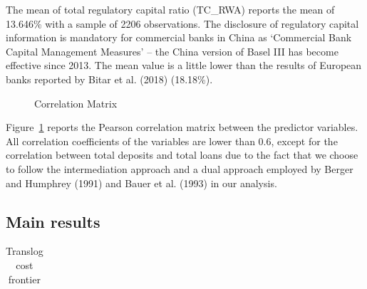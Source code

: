 \documentclass[
  12pt,
  a4paper,
]{scrreprt}
\begin{document}
{{{{The mean of total regulatory capital ratio (TC\_RWA) reports the mean of
13.646\% with a sample of 2206 observations. The disclosure of
regulatory capital information is mandatory for commercial banks in
China as `Commercial Bank Capital Management Measures' -- the China
version of Basel III has become effective since 2013. The mean value is
a little lower than the results of European banks reported by Bitar et
al. (2018) (18.18\%).

\begin{figure}[H]


\caption{\label{fig-correlationEff}Correlation Matrix}

\end{figure}%

Figure~\ref{fig-correlationEff} reports the Pearson correlation matrix
between the predictor variables. All correlation coefficients of the
variables are lower than 0.6, except for the correlation between total
deposits and total loans due to the fact that we choose to follow the
intermediation approach and a dual approach employed by Berger and
Humphrey (1991) and Bauer et al. (1993) in our analysis.

\subsection{Main results}\label{main-results-1}

\begin{longtable}[]{@{}ccc@{}}

\caption{\label{tbl-translog}Translog cost frontier}


\end{longtable}}}}}
\end{document}
